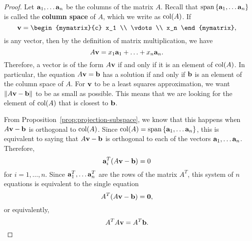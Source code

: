 \begin{proof}
  Let $\vect{a}_1,\ldots\vect{a}_n$ be the columns of the matrix
  $A$. Recall that $\sspan\set{\vect{a}_1,\ldots\vect{a}_n}$ is called
  the \textbf{column space}%
   of $A$, which we write as $\col(A)$.  If
  \begin{equation*}
    \vect{v} = \begin{mymatrix}{c} x_1 \\ \vdots \\ x_n \end{mymatrix},
  \end{equation*}
  is any vector, then by the definition of matrix multiplication, we
  have
  \begin{equation*}
    A\vect{v} = x_1\vect{a}_1 + \ldots + x_n\vect{a}_n.
  \end{equation*}
  Therefore, a vector is of the form $A\vect{v}$ if and only if it is
  an element of $\col(A)$. In particular, the equation
  $A\vect{v}=\vect{b}$ has a solution if and only if $\vect{b}$ is an
  element of the column space of $A$. For $\vect{v}$ to be a least
  squares approximation, we want $\norm{A\vect{v}-\vect{b}}$ to be as
  small as possible. This means that we are looking for the element of
  $\col(A)$ that is closest to $\vect{b}$.
  \begin{center}
  \end{center}
  From Proposition~\ref{prop:projection-subspace}, we know that this
  happens when $A\vect{v}-\vect{b}$ is orthogonal to $\col(A)$. Since
  $\col(A)=\sspan\set{\vect{a}_1,\ldots\vect{a}_n}$, this is
  equivalent to saying that $A\vect{v}-\vect{b}$ is orthogonal to each of
  the vectors $\vect{a}_1,\ldots\vect{a}_n$. Therefore,
  \begin{equation*}
    \vect{a}_i^T(A\vect{v}-\vect{b})=0
  \end{equation*}
  for $i=1,\ldots,n$. Since $\vect{a}_1^T,\ldots\vect{a}_n^T$ are the
  rows of the matrix $A^T$, this system of $n$ equations is equivalent
  to the single equation
  \begin{equation*}
    A^T(A\vect{v}-\vect{b})=\vect{0},
  \end{equation*}
  or equivalently,
  \begin{equation*}
    A^TA\vect{v} = A^T\vect{b}.
  \end{equation*}
\end{proof}


